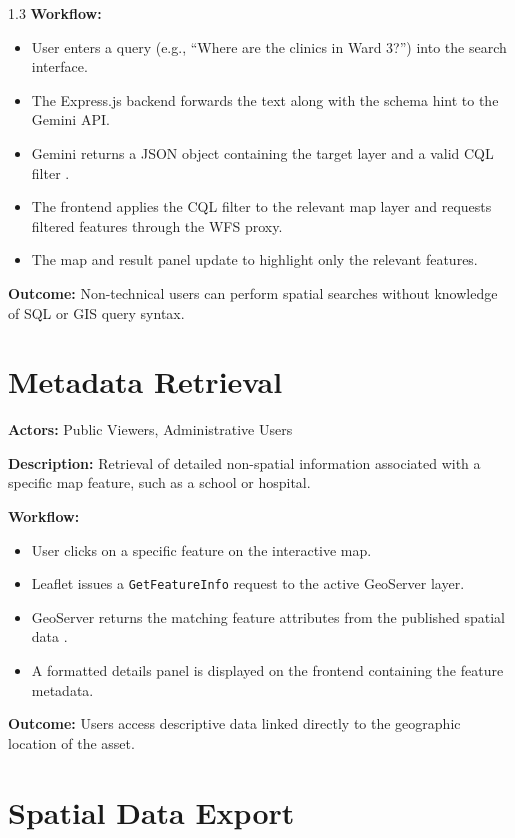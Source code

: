 \begin{spacing}{1.3}
\textbf{Workflow:}
\begin{itemize}
    \item User enters a query (e.g., ``Where are the clinics in Ward 3?'') into the search interface.
    \item The Express.js backend forwards the text along with the schema hint to the Gemini API.
    \item Gemini returns a JSON object containing the target layer and a valid CQL filter \cite{liu2025nalspatial}.
    \item The frontend applies the CQL filter to the relevant map layer and requests filtered features through the WFS proxy.
    \item The map and result panel update to highlight only the relevant features.
\end{itemize}

\textbf{Outcome:}
Non-technical users can perform spatial searches without knowledge of SQL or GIS query syntax.

\section{Metadata Retrieval}

\textbf{Actors:} Public Viewers, Administrative Users

\textbf{Description:}
Retrieval of detailed non-spatial information associated with a specific map feature, such as a school or hospital.

\textbf{Workflow:}
\begin{itemize}
    \item User clicks on a specific feature on the interactive map.
    \item Leaflet issues a \texttt{GetFeatureInfo} request to the active GeoServer layer.
    \item GeoServer returns the matching feature attributes from the published spatial data \cite{postgis_in_action}.
    \item A formatted details panel is displayed on the frontend containing the feature metadata.
\end{itemize}

\textbf{Outcome:}
Users access descriptive data linked directly to the geographic location of the asset.

\section{Spatial Data Export}


\end{spacing}
